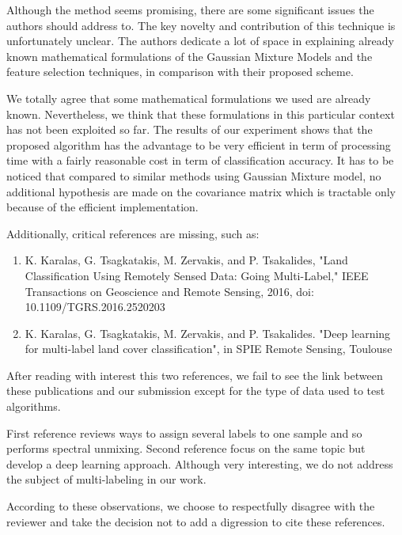 \documentclass[a4paper,10pt,DIV=16]{scrartcl}
\begin{document}
\begin{revbox}
  Although the method seems promising, there are some significant issues the authors should address to. The key novelty and contribution of this technique is unfortunately unclear. The authors dedicate a lot of space in explaining already known mathematical formulations of the Gaussian Mixture Models and the feature selection techniques, in comparison with their proposed scheme.
  \begin{resbox}
    We totally agree that some mathematical formulations we used are already known. Nevertheless, we think that these formulations in this particular context has not been exploited so far. The results of our experiment shows that the proposed algorithm has the advantage to be very efficient in term of processing time with a fairly reasonable cost in term of classification accuracy. It has to be noticed that compared to similar methods using Gaussian Mixture model, no additional hypothesis are made on the covariance matrix which is tractable only because of the efficient implementation.
  \end{resbox}
\end{revbox}

\begin{revbox}
  Additionally, critical references are missing, such as:
  \begin{enumerate}
  \item K. Karalas, G. Tsagkatakis, M. Zervakis, and P. Tsakalides, "Land Classification Using Remotely Sensed Data: Going Multi-Label," IEEE Transactions on Geoscience and Remote Sensing, 2016, doi: 10.1109/TGRS.2016.2520203
  \item K. Karalas, G. Tsagkatakis, M. Zervakis, and P. Tsakalides. "Deep learning for multi-label land cover classification", in SPIE Remote Sensing, Toulouse
  \end{enumerate}

  \begin{resbox}
    After reading with interest this two references, we fail to see the link between these publications and our submission except for the type of data used to test algorithms.

    First reference reviews ways to assign several labels to one sample and so performs spectral unmixing. Second reference focus on the same topic but develop a deep learning approach. Although very interesting, we do not address the subject of multi-labeling in our work.

    According to these observations, we choose to respectfully disagree with the reviewer and take the decision not to add a digression to cite these references.
  \end{resbox}
\end{revbox}
\end{document}
